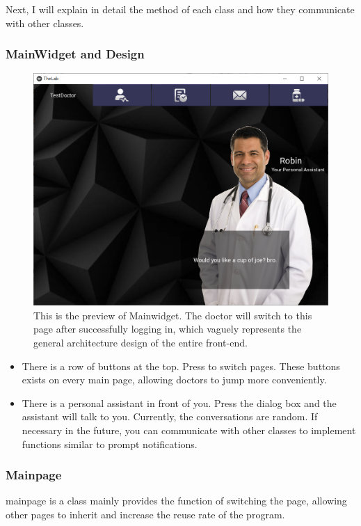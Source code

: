 \documentclass{article}
\begin{document}
Next, I will explain in detail the method of each class and how they communicate with other classes.

\subsubsection*{MainWidget and Design}
\begin{figure}[h]
    \centering
    \includegraphics[scale = 0.5]{asset/doctor_gui/frontend_main.png}
    \caption{This is the preview of Mainwidget. The doctor will switch to this page after successfully logging in, which vaguely represents the general architecture design of the entire front-end.}
    \label{fig:frontend_main}
\end{figure}
\begin{itemize}
    \item There is a row of buttons at the top. Press to switch pages. These buttons exists on every main page, allowing doctors to jump more conveniently.
    \item There is a personal assistant in front of you. Press the dialog box and the assistant will talk to you. Currently, the conversations are random. If necessary in the future, you can communicate with other classes to implement functions similar to prompt notifications.
\end{itemize}

\subsubsection*{Mainpage}
mainpage is a class mainly provides the function of switching the page, allowing other pages to inherit and increase the reuse rate of the program.
\end{document}
